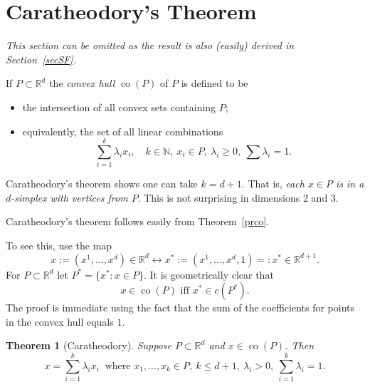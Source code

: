 \documentclass[a4paper]{amsart}
\theoremstyle{plain}
\newtheorem{theorem}{Theorem}[section]
\theoremstyle{definition}
\theoremstyle{remark}
\DeclareMathOperator{\co}{co}
\begin{document}

\section{\textbf{Caratheodory's Theorem}}  

\noindent \emph{This section can be omitted as the result is also (easily) derived in Section~\ref{secSF}.}

\bigskip If $ P \subset \mathbb{R}^d  $ the \emph{convex hull} $ \co(P) $ of $ P $ is defined to be
\begin{itemize}
\item the intersection of all convex  sets containing $ P $;
\item equivalently, the set of all linear combinations
\[
\sum_{i=1}^k \lambda_i x_i ,\quad  k \in \mathbb{N},\  x_i \in P, \  \lambda_i \geq 0,\ \sum \lambda_i = 1   .
\]
\end{itemize}  
Caratheodory's theorem shows one can take $ k = d + 1 $.  That is, \emph{each $ x \in P $ is in a $ d    $-simplex with vertices  from $ P $}.  This is not surprising in dimensions 2 and 3.

\medskip Caratheodory's theorem follows easily from Theorem~\ref{prco}.  

\medskip
To see this, use the map
\begin{equation} \label{} 
x := (x^1, \dots, x^d) \in \mathbb{R}^d  \leftrightarrow  x^* := (x^1, \dots, x^d, 1) =: x^* \in \mathbb{R}^{d +1}.
\end{equation} 
For  $ P \subset \mathbb{R}^d  $   let $ P^* = \{x^* : x \in P \} $.  It  is  geometrically  clear that
\begin{equation} \label{} 
x \in \co (P) \text{ iff } x^* \in c (P^*).
\end{equation} 
The proof is immediate using the fact that the sum of the coefficients for points in the convex hull equals $ 1 $.  


 

\begin{theorem}[Caratheodory] Suppose $ P\subset \mathbb{R}^d  $ and $  x \in \co (P) $. Then
\begin{equation} \label{eq1} 
 x = \sum_{i=1}^{ k } \lambda_i x_i\  \text{ where } x_1,\dots , x_k \in P,\  k \leq d+ 1,\  \lambda_i > 0 ,\ \sum_{i=1}^{ k } \lambda_i = 1.
\end{equation} 
\end{theorem}  
\end{document}

